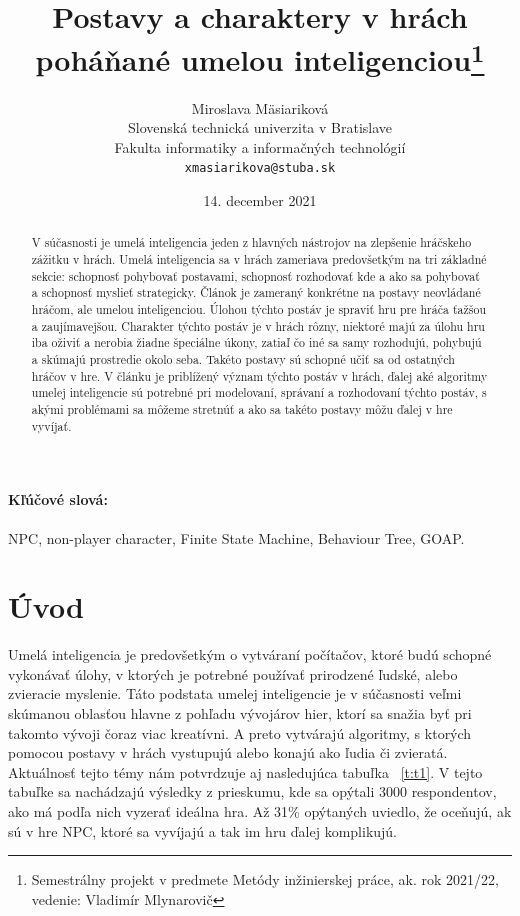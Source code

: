 \documentclass[10pt,twoside,slovak,a4paper]{article}
\title{Postavy a charaktery v hrách poháňané umelou inteligenciou\thanks{Semestrálny projekt v predmete Metódy inžinierskej práce, ak. rok 2021/22, vedenie: Vladimír Mlynarovič}} %
\author{Miroslava Mäsiariková\\[2pt]
	{\small Slovenská technická univerzita v Bratislave}\\
	{\small Fakulta informatiky a informačných technológií}\\
	{\small \texttt{xmasiarikova@stuba.sk}}
	}
\date{\small 14. december 2021} %
\begin{document}
\maketitle

\begin{abstract}

V súčasnosti je umelá inteligencia jeden z hlavných nástrojov na zlepšenie hráčskeho zážitku v hrách. Umelá inteligencia sa v hrách zameriava predovšetkým na tri základné sekcie: schopnosť pohybovať postavami, schopnosť rozhodovať kde a ako sa pohybovať a schopnosť myslieť strategicky. Článok je zameraný  konkrétne na postavy neovládané hráčom, ale umelou inteligenciou. Úlohou týchto postáv je spraviť hru pre hráča ťažšou a zaujímavejšou. Charakter týchto postáv je v hrách rôzny, niektoré majú za úlohu hru iba oživiť a nerobia žiadne špeciálne úkony, zatiaľ čo iné sa samy rozhodujú, pohybujú a skúmajú prostredie okolo seba. Takéto postavy sú schopné učiť sa od ostatných hráčov v hre. V článku je priblížený význam týchto postáv v hrách, ďalej aké algoritmy umelej inteligencie sú potrebné pri modelovaní, správaní a rozhodovaní týchto postáv, s akými problémami sa môžeme stretnúť a ako sa takéto postavy môžu ďalej v hre vyvíjať. 
\end{abstract}

\paragraph{Kľúčové slová:}NPC, non-player character, Finite State Machine, Behaviour Tree, GOAP.

\section{Úvod}

\quad Umelá inteligencia je predovšetkým o vytváraní počítačov, ktoré budú schopné vykonávať úlohy, v ktorých je potrebné používať prirodzené ľudské, alebo zvieracie myslenie. Táto podstata umelej inteligencie je v súčasnosti veľmi skúmanou oblasťou hlavne z pohľadu vývojárov hier, ktorí sa snažia byť pri takomto vývoji čoraz viac kreatívni. A preto vytvárajú algoritmy, s ktorých pomocou postavy v hrách vystupujú alebo konajú ako ľudia či zvieratá. Aktuálnosť tejto témy nám potvrdzuje aj nasledujúca tabuľka ~\ref{t:t1}. V tejto tabuľke sa nachádzajú výsledky z prieskumu, kde sa opýtali 3000 respondentov, ako má podľa nich vyzerať ideálna hra. Až 31\% opýtaných uviedlo, že oceňujú, ak sú v hre NPC, ktoré sa vyvíjajú a tak im hru ďalej komplikujú. 
\end{document}

